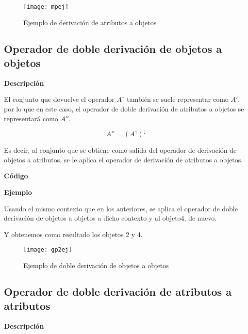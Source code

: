         \begin{figure}[H]
            \centering
            \texttt{[image: mpej]}
            \caption{Ejemplo de derivaci\'on de atributos a objetos}
            \label{fig:mpej}
        \end{figure}


    \subsection{Operador de doble derivaci\'on de objetos a objetos}

        \textbf{Descripci\'on}

        El conjunto que devuelve el operador \( A^\uparrow \) tambi\'en se suele representar como \( A' \), por lo que en este caso, 
        el operador de doble derivaci\'on de atributos a objetos se representar\'a como \( A'' \).


        \[ A'' = (A^\uparrow)^\downarrow \]

        Es decir, al conjunto que se obtiene como salida del operador de derivaci\'on de objetos a atributos, se le aplica el operador 
        de derivaci\'on de atributos a objetos.


        \bigskip

        \textbf{C\'odigo}

        

        \clearpage

        \textbf{Ejemplo}

        Usando el mismo contexto que en los anteriores, se aplica el operador de doble derivaci\'on de objetos a objetos a dicho 
        contexto y al objeto4, de nuevo.

        Y obtenemos como resultado los objetos 2 y 4.

        \begin{figure}[H]
            \centering
            \texttt{[image: gp2ej]}
            \caption{Ejemplo de doble derivaci\'on de objetos a objetos}
            \label{fig:gp2ej}
        \end{figure}



    \subsection{Operador de doble derivaci\'on de atributos a atributos}

        \textbf{Descripci\'on}


